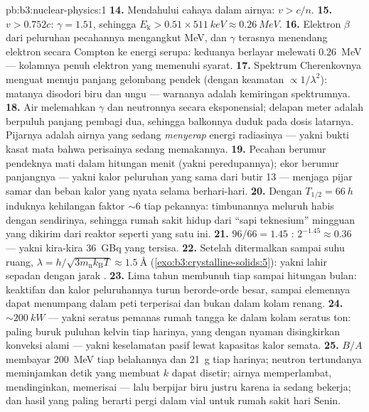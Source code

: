 \begin{solution}{pb:b3:nuclear-physics:1}
\textbf{14.} Mendahului cahaya dalam airnya: $v > c/n$.
\textbf{15.} $v > 0.752c$: $\gamma = 1.51$, sehingga $E_{\text{k}} >
0.51\times\qty{511}{keV} \approx \qty{0.26}{MeV}$.
\textbf{16.} Elektron $\beta$ dari peluruhan pecahannya mengangkut
\unit{MeV}, dan $\gamma$ terasnya menendang elektron secara Compton ke
energi serupa: keduanya berlayar melewati \qty{0.26}{MeV} --- kolamnya
penuh elektron yang memenuhi syarat.
\textbf{17.} Spektrum Cherenkovnya menguat menuju panjang gelombang
pendek (dengan keamatan $\propto1/\lambda^2$): matanya
disodori biru dan ungu --- warnanya adalah kemiringan spektrumnya.
\textbf{18.} Air melemahkan $\gamma$ dan neutronnya secara
eksponensial; delapan meter adalah berpuluh panjang pembagi dua, sehingga
balkonnya duduk pada dosis latarnya. Pijarnya adalah airnya yang sedang
\emph{menyerap} energi radiasinya --- yakni bukti kasat mata bahwa
perisainya sedang memakannya.
\textbf{19.} Pecahan berumur pendeknya mati dalam hitungan menit
(yakni peredupannya); ekor berumur panjangnya --- yakni kalor peluruhan yang sama
dari butir 13 --- menjaga pijar samar dan beban kalor yang nyata selama
berhari-hari.
\textbf{20.} Dengan $T_{1/2} = \qty{66}{h}$ induknya kehilangan
faktor ${\sim}6$ tiap pekannya: timbunannya meluruh habis dengan sendirinya,
sehingga rumah sakit hidup dari ``sapi teknesium'' mingguan yang dikirim dari
reaktor seperti yang satu ini.
\textbf{21.} $96/66 = 1.45$ : $2^{-1.45} \approx
0.36$ --- yakni kira-kira \qty{36}{GBq} yang tersisa.
\textbf{22.} Setelah ditermalkan sampai suhu ruang, $\lambda =
h/\sqrt{3m_{\text{n}}k_{\text{B}}T} \approx \qty{1.5}{\angstrom}$
(\cref{exo:b3:crystalline-solids:5}): yakni lahir sepadan dengan jarak
.
\textbf{23.} Lima tahun membunuh tiap  sampai hitungan bulan:
keaktifan dan kalor peluruhannya turun berorde-orde besar, sampai
elemennya dapat menumpang dalam peti terperisai dan bukan dalam kolam renang.
\textbf{24.} ${\sim}\qty{200}{kW}$ --- yakni seratus pemanas rumah
tangga ke dalam kolam seratus ton: paling buruk puluhan kelvin tiap harinya,
yang dengan nyaman disingkirkan konveksi alami --- yakni keselamatan pasif
lewat kapasitas kalor semata.
\textbf{25.} $B/A$ membayar \qty{200}{MeV} tiap belahannya dan \qty{21}{g}
tiap harinya; neutron tertundanya meminjamkan detik yang membuat $k$
dapat disetir; airnya memperlambat, mendinginkan, memerisai --- lalu berpijar
biru justru karena ia sedang bekerja; dan hasil yang paling berarti
pergi dalam vial untuk rumah sakit hari Senin.
\end{solution}
